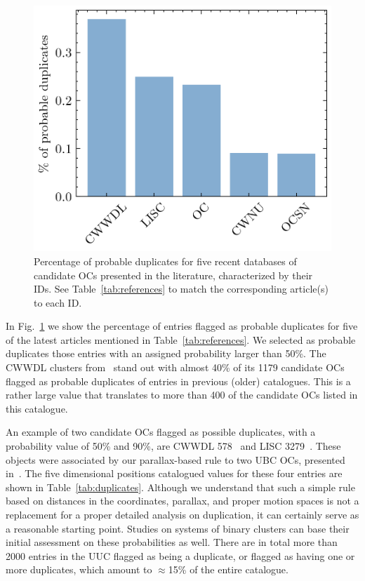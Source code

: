 \documentclass[fleqn,usenatbib]{mnras}
\begin{document}
\begin{figure}
	\includegraphics[width=\columnwidth]{figs/duplicates.png}
    \caption{Percentage of probable duplicates for five recent databases of
    candidate OCs presented in the literature, characterized by their IDs.
    See Table~\ref{tab:references} to match the corresponding article(s)
    to each ID.}
    \label{fig:duplicates}
\end{figure}

In Fig.~\ref{fig:duplicates} we show the percentage of entries flagged as
probable duplicates for five of the latest articles mentioned in
Table~\ref{tab:references}. We selected as probable duplicates those entries
with an assigned probability larger than 50\%.
The CWWDL clusters from~\cite{Chi_2023_3} stand out with almost 40\% of its
1179 candidate OCs flagged as probable duplicates of entries in previous (older)
catalogues. This is a rather large value that translates to more than 400 of the
candidate OCs listed in this catalogue.

An example of two candidate OCs flagged as possible duplicates, with a
probability value of 50\% and 90\%, are CWWDL 578~\cite{Chi_2023_3} and
LISC 3279~\citep{Li_2022}. These objects
were associated by our parallax-based rule to two UBC OCs, presented
in~\cite{Castro-Ginard_2020}.
The five dimensional positions catalogued values for these four entries
are shown in Table~\ref{tab:duplicates}.
Although we understand that such a simple rule based on distances in the
coordinates, parallax, and proper motion spaces is not a replacement for a
proper detailed analysis on duplication, it can certainly serve as a reasonable
starting point. Studies on systems of binary clusters can base their initial
assessment on these probabilities as well. There are in total more than 2000
entries in the UUC flagged as being a duplicate, or flagged as having one or
more duplicates, which amount to $\approx$15\% of the entire catalogue.
\end{document}
